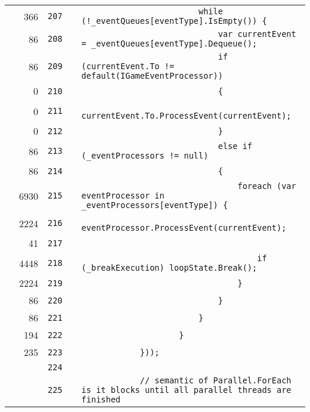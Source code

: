 \documentclass[a4paper,landscape,10pt]{article}
\begin{document}
\begin{longtable}[l]{lrrll}
\cellcolor{green} & 366 & \verb~207~ & & \verb~                        while (!_eventQueues[eventType].IsEmpty()) {~\\
\cellcolor{green} & 86 & \verb~208~ & & \verb~                            var currentEvent = _eventQueues[eventType].Dequeue();~\\
\cellcolor{green} & 86 & \verb~209~ & & \verb~                            if (currentEvent.To != default(IGameEventProcessor))~\\
\cellcolor{red} & 0 & \verb~210~ & & \verb~                            {~\\
\cellcolor{red} & 0 & \verb~211~ & & \verb~                                currentEvent.To.ProcessEvent(currentEvent);~\\
\cellcolor{red} & 0 & \verb~212~ & & \verb~                            }~\\
\cellcolor{green} & 86 & \verb~213~ & & \verb~                            else if (_eventProcessors != null)~\\
\cellcolor{green} & 86 & \verb~214~ & & \verb~                            {~\\
\cellcolor{green} & 6930 & \verb~215~ & & \verb~                                foreach (var eventProcessor in _eventProcessors[eventType]) {~\\
\cellcolor{green} & 2224 & \verb~216~ & & \verb~                                    eventProcessor.ProcessEvent(currentEvent);~\\
\cellcolor{green} & 41 & \verb~217~ & & \verb~~\\
\cellcolor{green} & 4448 & \verb~218~ & & \verb~                                    if (_breakExecution) loopState.Break();~\\
\cellcolor{green} & 2224 & \verb~219~ & & \verb~                                }~\\
\cellcolor{green} & 86 & \verb~220~ & & \verb~                            }~\\
\cellcolor{green} & 86 & \verb~221~ & & \verb~                        }~\\
\cellcolor{green} & 194 & \verb~222~ & & \verb~                    }~\\
\cellcolor{green} & 235 & \verb~223~ & & \verb~            }));~\\
\cellcolor{gray} &  & \verb~224~ & & \verb~~\\
\cellcolor{gray} &  & \verb~225~ & & \verb~            // semantic of Parallel.ForEach is it blocks until all parallel threads are finished~\\

\end{longtable}
\end{document}
